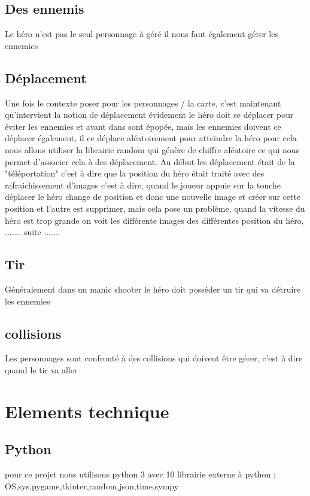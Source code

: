 \documentclass[a4paper, 11pt]{article}
\begin{document}
	\subsection{Des ennemis}
Le héro n'est pas le seul personnage à géré il nous faut également gérer les ennemies
	\subsection{Déplacement}
Une fois le contexte poser pour les personnages / la carte, c'est maintenant qu'intervient la notion de déplacement évidement le héro doit se déplacer pour éviter les ennemies et avant dans sont épopée, mais les ennemies doivent ce déplacer également, il ce déplace aléatoirement pour atteindre la héro pour cela nous allons utiliser la librairie random qui génère de chiffre aléatoire ce qui nous permet d'associer cela à des déplacement.
Au début les déplacement était de la "téléportation" c'est à dire que la position du héro était traité avec des rafraichissement d'images c'est à dire, quand le joueur appuie sur la touche déplacer le héro change de position et donc une nouvelle image et créer sur cette position et l'autre est supprimer, mais cela pose un problème, quand la vitesse du héro est trop grande on voit les différente images des différentes position du héro, ....... suite .......
	
	\subsection{Tir}
Généralement dans un manic shooter le héro doit posséder un tir qui va détruire les ennemies 
	\subsection{collisions}
Les personnages sont confronté à des collisions qui doivent être gérer, c'est à dire quand le tir va aller

\section{Elements technique}

\subsection{Python}

pour ce projet nous utilisons python 3 avec 10 librairie externe à python :
OS,sys,pygame,tkinter,random,json,time,sympy
\end{document}
